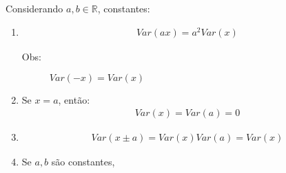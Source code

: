 \begin{description}
         Considerando $a,b \in \mathbb{R}$, constantes:
         \begin{enumerate}[label=(\alph*)]
           \item 
             \begin{align*}
             Var(ax)=a^2Var(x)
           \end{align*}
             \begin{description}
               \item[Obs:] $Var(-x)=Var(x)$
           \end{description}
           \item Se $x=a$, então:
             \begin{align*}
Var(x)=Var(a)=0
           \end{align*}
         \item 
           \begin{align*}
             Var(x \pm a)=Var(x)Var(a)=Var(x)
           \end{align*}
           \item Se $a,b$ são constantes,


\end{enumerate}
\end{description}
